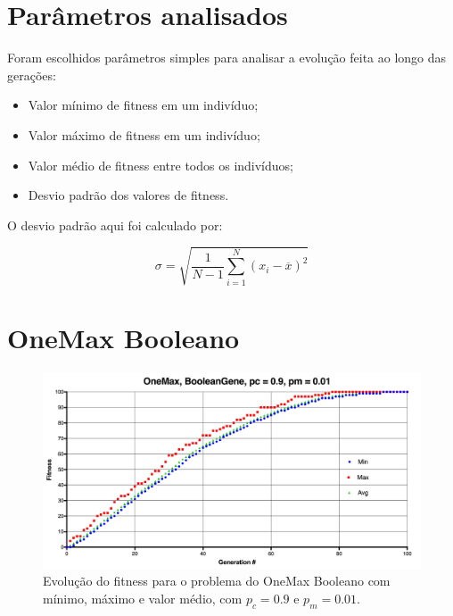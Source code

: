 \label{5_resultados}

\section{Parâmetros analisados}

Foram escolhidos parâmetros simples para analisar a evolução feita ao longo das gerações:

\begin{itemize}
	\item Valor mínimo de fitness em um indivíduo;
	\item Valor máximo de fitness em um indivíduo;
	\item Valor médio de fitness entre todos os indivíduos;
	\item Desvio padrão dos valores de fitness.
\end{itemize}

O desvio padrão aqui foi calculado por:

\begin{equation}
	\sigma = \sqrt{\frac{1}{N-1} \sum_{i=1}^N (x_i - \overline{x})^2}
\end{equation}

\section{OneMax Booleano}

\begin{figure}[ht!]
    \centering \includegraphics[width=1.0\textwidth]{onemax_boolean.jpg}
    \caption{Evolução do fitness para o problema do OneMax Booleano com mínimo, máximo e valor médio, com $p_c=0.9$ e $p_m=0.01$.}
    \label{fig:onemax_boolean}
\end{figure}

